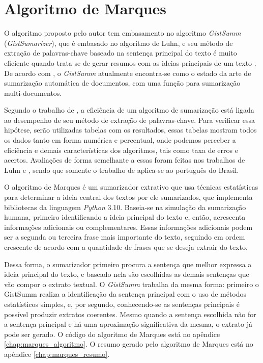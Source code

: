 \section{Algoritmo de Marques}
\label{chap:marques}
O algoritmo proposto pelo autor tem embasamento no algoritmo \textit{GistSumm} (\textit{GistSumarizer}), que é embasado no algoritmo de Luhn, e seu método de extração de palavras-chave baseado na sentença principal do texto é muito eficiente quando trata-se de gerar resumos com as ideias principais de um texto \cite{castro2022extraccao}. De acordo com , o \textit{GistSumm} atualmente encontra-se como o estado da arte de sumarização automática de documentos, com uma função para sumarização multi-documentos.

Segundo o trabalho de , a eficiência de um algoritmo de sumarização está ligada ao desempenho de seu método de extração de palavras-chave. Para verificar essa hipótese, serão utilizadas tabelas com os resultados, essas tabelas mostram todos os dados tanto em forma numérica e percentual, onde podemos perceber a eficiência e demais características dos algoritmos, tais como taxa de erros e acertos. Avaliações de forma semelhante a essas foram feitas nos trabalhos de Luhn e , sendo que somente o trabalho de  aplica-se ao português do Brasil.

O algoritmo de Marques é um sumarizador extrativo que usa técnicas estatísticas para determinar a ideia central dos textos por ele sumarizados, que implementa bibliotecas da linguagem \textit{Python} 3.10. Baseia-se na simulação da sumarização humana, primeiro identificando a ideia principal do texto e, então, acrescenta informações adicionais ou complementares. Essas informações adicionais podem ser a segunda ou terceira frase mais importante do texto, seguindo em ordem crescente de acordo com a quantidade de frases que se deseja extrair do texto.

Dessa forma, o sumarizador primeiro procura a sentença que melhor expressa a ideia principal do texto, e baseado nela são escolhidas as demais sentenças que vão compor o extrato textual. O \textit{GistSumm} trabalha da mesma forma: primeiro o GistSumm realiza a identificação da sentença principal com o uso de métodos estatísticos simples, e, por segundo, conhecendo-se as sentenças principais é possível produzir extratos coerentes. Mesmo quando a sentença escolhida não for a sentença principal e há uma aproximação significativa da mesma, o extrato já pode ser gerado.
O código do algoritmo de Marques está no apêndice \ref{chap:marques_algoritmo}.
O resumo gerado pelo algoritmo de Marques está no apêndice \ref{chap:marques_resumo}.